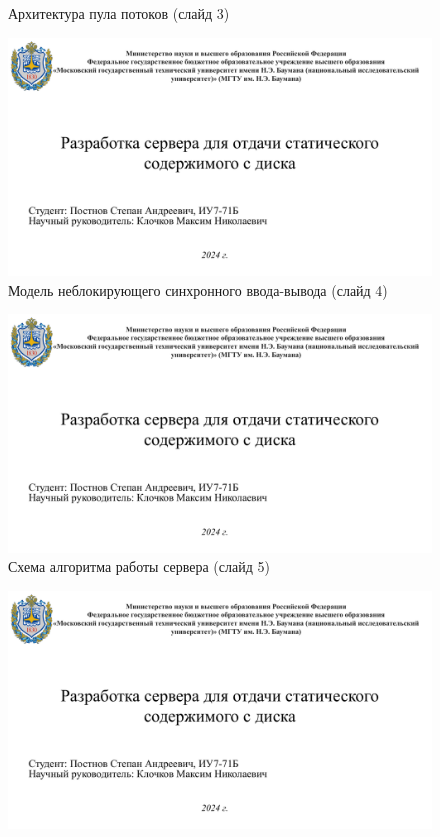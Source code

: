 \begin{appendices}
\begin{figure}[h]
		\caption{Архитектура пула потоков (слайд 3)}
	\end{figure}
	\begin{figure}[h]
		\centering
		\includegraphics[height=0.5\textheight, page=4, angle=90]{inc/img/pres.pdf}
		\caption{Модель неблокирующего синхронного ввода-вывода (слайд 4)}
	\end{figure}
	\begin{figure}[h]
		\centering
		\includegraphics[height=0.5\textheight, page=5, angle=90]{inc/img/pres.pdf}
		\caption{Схема алгоритма работы сервера (слайд 5)}
	\end{figure}
	\begin{figure}[h]
		\centering
		\includegraphics[height=0.5\textheight, page=6, angle=90]{inc/img/pres.pdf}

\end{figure}
\end{appendices}
